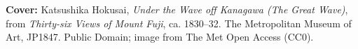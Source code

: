 \noindent\textbf{Cover:} Katsushika Hokusai,
\textit{Under the Wave off Kanagawa (The Great Wave)}, from
\textit{Thirty-six Views of Mount Fuji}, ca. 1830--32. The Metropolitan Museum
of Art, JP1847. Public Domain; image from The Met Open Access (CC0).
